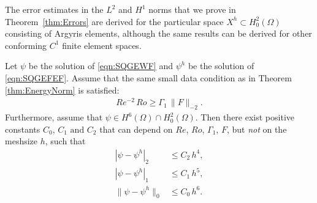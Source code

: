 The error estimates in the $L^2$ and $H^1$ norms that we prove in Theorem~\ref{thm:Errors} are
derived for the particular space $X^h\subset H^2_0(\Omega)$ consisting of Argyris elements, although
the same results can be derived for other conforming $C^1$ finite element spaces.
\begin{thm} \label{thm:Errors}
  Let $\psi$ be the solution of \eqref{eqn:SQGEWF} and $\psi^h$ be the solution
  of \eqref{eqn:SQGEFEF}.
  Assume that the same small data condition as in Theorem \ref{thm:EnergyNorm} is satisfied:
  \begin{eqnarray}
  Re^{-2} \, Ro
  \geq \Gamma_1 \, \| F \|_{-2} .
  \label{eqn:small_data_condition_dual}
  \end{eqnarray}
  Furthermore, assume that $\psi\in H^6(\Omega) \cap H^2_0(\Omega)$.
  Then there exist positive constants $C_0, \, C_1 \text{ and } C_2$ that can depend on $Re$, $Ro$, $\Gamma_1$, $F$, but \emph{not} on the meshsize $h$, such that
  \begin{align}
    |\psi - \psi^h|_2 &\le C_2 \, h^4 , \label{eqn:H2Error} \\
    |\psi - \psi^h|_1 &\le C_1 \, h^5 , \label{eqn:H1Error} \\
    \|\psi - \psi^h\|_0 &\le C_0 \, h^6 . \label{eqn:L2Error}
  \end{align}
\end{thm}
